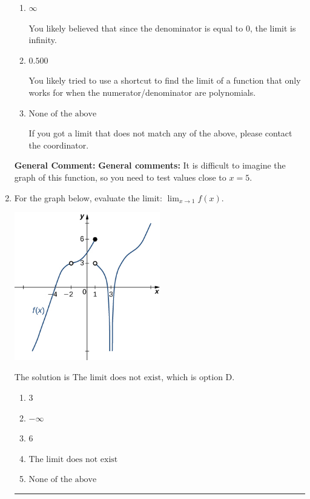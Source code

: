 \documentclass{extbook}[14pt]
\newcommand{\litem}[1]{\item #1

\rule{\textwidth}{0.4pt}}
\begin{document}
\begin{enumerate}
{\begin{enumerate}[label=\Alph*.]
* This is the correct option.
\item \( \infty \)

You likely believed that since the denominator is equal to 0, the limit is infinity.
\item \( 0.500 \)

You likely tried to use a shortcut to find the limit of a function that only works for when the numerator/denominator are polynomials.
\item \( \text{None of the above} \)

If you got a limit that does not match any of the above, please contact the coordinator.
\end{enumerate}

\textbf{General Comment:} \textbf{General comments:} It is difficult to imagine the graph of this function, so you need to test values close to $x = 5$.
}
\litem{
For the graph below, evaluate the limit: $ \displaystyle \lim_{x \rightarrow 1} f(x)$.

\begin{center}
    \includegraphics[width=0.5\textwidth]{../Figures/evaluateLimitGraphicallyB.png}
\end{center}


The solution is \( \text{The limit does not exist} \), which is option D.\begin{enumerate}[label=\Alph*.]
\item \( 3 \)


\item \( -\infty \)


\item \( 6 \)


\item \( \text{The limit does not exist} \)


\item \( \text{None of the above} \)



\end{enumerate}}
\end{enumerate}
\end{document}
